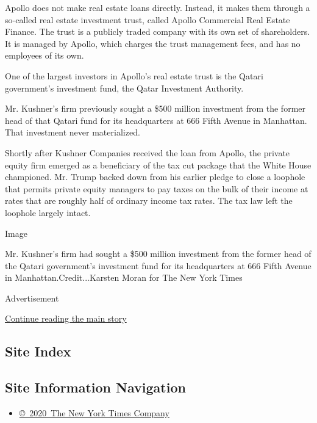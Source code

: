 Apollo does not make real estate loans directly. Instead, it makes them
through a so-called real estate investment trust, called Apollo
Commercial Real Estate Finance. The trust is a publicly traded company
with its own set of shareholders. It is managed by Apollo, which charges
the trust management fees, and has no employees of its own.

One of the largest investors in Apollo's real estate trust is the Qatari
government's investment fund, the Qatar Investment Authority.

Mr. Kushner's firm previously sought a \$500 million investment from the
former head of that Qatari fund for its headquarters at 666 Fifth Avenue
in Manhattan. That investment never materialized.

Shortly after Kushner Companies received the loan from Apollo, the
private equity firm emerged as a beneficiary of the tax cut package that
the White House championed. Mr. Trump backed down from his earlier
pledge to close a loophole that permits private equity managers to pay
taxes on the bulk of their income at rates that are roughly half of
ordinary income tax rates. The tax law left the loophole largely intact.

Image

Mr. Kushner's firm had sought a \$500 million investment from the former
head of the Qatari government's investment fund for its headquarters at
666 Fifth Avenue in Manhattan.Credit...Karsten Moran for The New York
Times

Advertisement

\protect\hyperlink{after-bottom}{Continue reading the main story}

\hypertarget{site-index}{%
\subsection{Site Index}\label{site-index}}

\hypertarget{site-information-navigation}{%
\subsection{Site Information
Navigation}\label{site-information-navigation}}

\begin{itemize}
\tightlist
\item
  \href{https://help.nytimes3xbfgragh.onion/hc/en-us/articles/115014792127-Copyright-notice}{©~2020~The
  New York Times Company}
\end{itemize}

